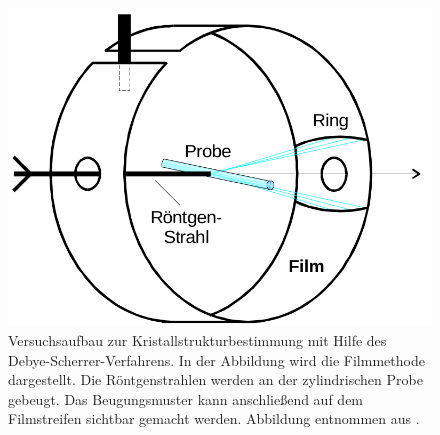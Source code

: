 \begin{figure}
  \centering
  \includegraphics[scale=0.35]{aufbau.png}
  \caption{Versuchsaufbau zur Kristallstrukturbestimmung mit Hilfe des Debye-Scherrer-Verfahrens. In der Abbildung wird die Filmmethode dargestellt. Die Röntgenstrahlen werden an der zylindrischen
  Probe gebeugt. Das Beugungsmuster kann anschließend auf dem Filmstreifen sichtbar gemacht werden. Abbildung entnommen aus \cite{V41}.}
  \label{abb:aufbau}
\end{figure}
